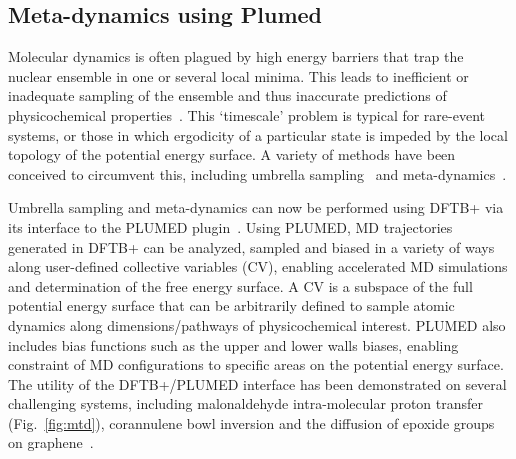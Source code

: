 \documentclass[reprint,onecolumn,superscriptaddress]{revtex4-1}
\newcommand{\dftbp}{DFTB+}
\begin{document}
\subsection{Meta-dynamics using Plumed}

Molecular dynamics is often plagued by high energy barriers that trap the
nuclear ensemble in one or several local minima. This leads to inefficient or
inadequate sampling of the ensemble and thus inaccurate predictions of
physicochemical properties~\cite{RN1,RN2,RN3}. This `timescale' problem is
typical for rare-event systems, or those in which ergodicity of a particular
state is impeded by the local topology of the potential energy surface. A
variety of methods have been conceived to circumvent this, including
umbrella sampling~\cite{RN8} and meta-dynamics~\cite{RN13}.

Umbrella sampling and meta-dynamics can now be performed using \dftbp{} via its
interface to the PLUMED plugin~\cite{RN15,RN16}. Using PLUMED, MD trajectories
generated in \dftbp{} can be analyzed, sampled and biased in a variety of ways
along user-defined collective variables (CV), enabling accelerated MD
simulations and determination of the free energy surface. A CV is a subspace of
the full potential energy surface that can be arbitrarily defined to sample
atomic dynamics along dimensions/pathways of physicochemical interest.  PLUMED
also includes bias functions such as the upper and lower walls biases, enabling
constraint of MD configurations to specific areas on the potential energy
surface. The utility of the \dftbp{}/PLUMED interface has been demonstrated on
several challenging systems, including malonaldehyde intra-molecular proton
transfer (Fig.~\ref{fig:mtd}), corannulene bowl inversion and the diffusion of
epoxide groups on graphene~\cite{RN16}.
\end{document}
